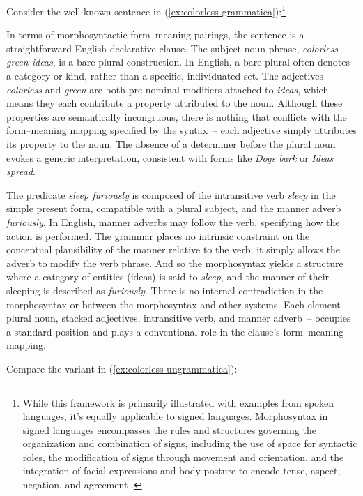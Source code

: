 \documentclass[12pt,letterpaper]{article}
\begin{document}
\bigskip
Consider the well-known sentence in (\ref{ex:colorless-grammatica}):\footnote{While this framework is primarily illustrated with examples from spoken languages, it's equally applicable to signed languages. Morphosyntax in signed languages encompasses the rules and structures governing the organization and combination of signs, including the use of space for syntactic roles, the modification of signs through movement and orientation, and the integration of facial expressions and body posture to encode tense, aspect, negation, and agreement \autocite{Quer2019}.}

\label{ex:colorless-grammatica}
\z
In terms of morphosyntactic form--meaning pairings, the sentence is a straightforward English declarative clause. The subject noun phrase, \textit{colorless green ideas}, is a bare plural construction. In English, a bare plural often denotes a category or kind, rather than a specific, individuated set. The adjectives \textit{colorless} and \textit{green} are both pre-nominal modifiers attached to \textit{ideas}, which means they each contribute a property attributed to the noun. Although these properties are semantically incongruous, there is nothing that conflicts with the form--meaning mapping specified by the syntax~-- each adjective simply attributes its property to the noun. The absence of a determiner before the plural noun evokes a generic interpretation, consistent with forms like \textit{Dogs bark} or \textit{Ideas spread}.

The predicate \textit{sleep furiously} is composed of the intransitive verb \textit{sleep} in the simple present form, compatible with a plural subject, and the manner adverb \textit{furiously}. In English, manner adverbs may follow the verb, specifying how the action is performed. The grammar places no intrinsic constraint on the conceptual plausibility of the manner relative to the verb; it simply allows the adverb to modify the verb phrase. And so the morphosyntax yields a structure where a category of entities (ideas) is said to \textit{sleep}, and the manner of their sleeping is described as \textit{furiously}. There is no internal contradiction in the morphosyntax or between the morphosyntax and other systems. Each element~-- plural noun, stacked adjectives, intransitive verb, and manner adverb~-- occupies a standard position and plays a conventional role in the clause’s form--meaning mapping.

Compare the variant in (\ref{ex:colorless-ungrammatica}):
\label{ex:colorless-ungrammatica}
\z
\end{document}
